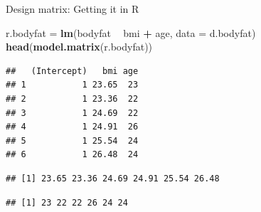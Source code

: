 \documentclass[10pt,ignorenonframetext,]{beamer}
\newenvironment{Shaded}{\begin{snugshade}}{\end{snugshade}}
\newcommand{\KeywordTok}[1]{\textcolor[rgb]{0.13,0.29,0.53}{\textbf{#1}}}
\newcommand{\DataTypeTok}[1]{\textcolor[rgb]{0.13,0.29,0.53}{#1}}
\newcommand{\StringTok}[1]{\textcolor[rgb]{0.31,0.60,0.02}{#1}}
\newcommand{\OperatorTok}[1]{\textcolor[rgb]{0.81,0.36,0.00}{\textbf{#1}}}
\newcommand{\NormalTok}[1]{#1}
\begin{document}
\begin{frame}[fragile]

\begin{block}{Design matrix: Getting it in R}

\scriptsize

\begin{Shaded}
\begin{Highlighting}[]
\NormalTok{r.bodyfat =}\StringTok{ }\KeywordTok{lm}\NormalTok{(bodyfat }\OperatorTok{~}\StringTok{ }\NormalTok{bmi }\OperatorTok{+}\StringTok{ }\NormalTok{age, }\DataTypeTok{data =}\NormalTok{ d.bodyfat)}
\KeywordTok{head}\NormalTok{(}\KeywordTok{model.matrix}\NormalTok{(r.bodyfat))}
\end{Highlighting}
\end{Shaded}

\begin{verbatim}
##   (Intercept)   bmi age
## 1           1 23.65  23
## 2           1 23.36  22
## 3           1 24.69  22
## 4           1 24.91  26
## 5           1 25.54  24
## 6           1 26.48  24
\end{verbatim}

\begin{Shaded}
\end{Shaded}

\begin{verbatim}
## [1] 23.65 23.36 24.69 24.91 25.54 26.48
\end{verbatim}

\begin{Shaded}
\end{Shaded}

\begin{verbatim}
## [1] 23 22 22 26 24 24
\end{verbatim}

\normalsize

\end{block}

\end{frame}
\end{document}
